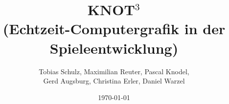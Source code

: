 \documentclass{scrreprt}
\begin{document}
\title{KNOT$^3$\\(Echtzeit-Computergrafik in der Spieleentwicklung)}
\author{Tobias Schulz, Maximilian Reuter, Pascal Knodel, \\Gerd Augsburg, Christina Erler, Daniel Warzel} 
\date{\today}%

\maketitle
\tableofcontents


















\end{document}
